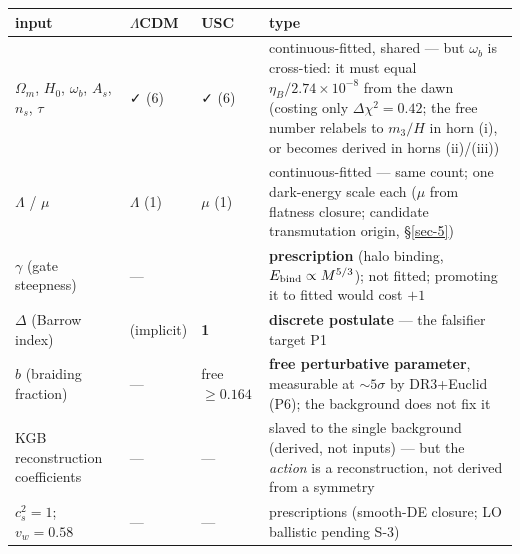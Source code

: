 \documentclass[submission, Phys]{SciPost}
\begin{document}
\begin{longtable}[]{@{}
  >{\raggedright\arraybackslash}p{}
  >{\raggedright\arraybackslash}p{}
  >{\raggedright\arraybackslash}p{}
  >{\raggedright\arraybackslash}p{}@{}}
\toprule\noalign{}
\begin{minipage}[b]{\linewidth}\raggedright
input
\end{minipage} & \begin{minipage}[b]{\linewidth}\raggedright
\(\Lambda\)CDM
\end{minipage} & \begin{minipage}[b]{\linewidth}\raggedright
USC
\end{minipage} & \begin{minipage}[b]{\linewidth}\raggedright
type
\end{minipage} \\
\midrule\noalign{}
\endhead
\bottomrule\noalign{}
\endlastfoot
\(\Omega_m\), \(H_0\), \(\omega_b\), \(A_s\), \(n_s\), \(\tau\) & ✓ (6)
& ✓ (6) & continuous-fitted, shared --- but \(\omega_b\) is cross-tied:
it must equal \(\eta_B/2.74\times 10^{-8}\) from the dawn (costing only
\(\Delta\chi^2 = 0.42\); the free number relabels to \(m_3/H\) in horn
(i), or becomes derived in horns (ii)/(iii)) \\
\(\Lambda\) / \(\mu\) & \(\Lambda\) (1) & \(\mu\) (1) &
continuous-fitted --- same count; one dark-energy scale each (\(\mu\)
from flatness closure; candidate transmutation origin, §\ref{sec-5}) \\
\(\gamma\) (gate steepness) & --- & 1.5 & \textbf{prescription} (halo
binding, \(E_{\rm bind}\propto M^{5/3}\)); not fitted; promoting it to
fitted would cost \(+1\) \\
\(\Delta\) (Barrow index) & 0 (implicit) & \textbf{1} & \textbf{discrete
postulate} --- the falsifier target P1 \\
\(b\) (braiding fraction) & --- & free \(\ge 0.164\) & \textbf{free
perturbative parameter}, measurable at \(\sim 5\sigma\) by DR3+Euclid
(P6); the background does not fix it \\
16 KGB reconstruction coefficients & --- & --- & slaved to the single
background (derived, not inputs) --- but the \emph{action} is a
reconstruction, not derived from a symmetry \\
\(c_s^2 = 1\); \(v_w = 0.58\) & --- & --- & prescriptions (smooth-DE
closure; LO ballistic pending S-3) \\

\end{longtable}
\end{document}
